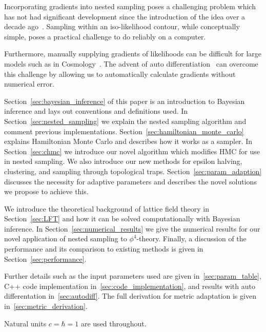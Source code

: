 \documentclass[11pt]{article}
\begin{document}
    Incorporating gradients into nested sampling poses a challenging problem which has not had significant development
    since the introduction of the idea over a decade ago~\cite{Betancourt_NS_CHMC, GMC}.
    Sampling within an iso-likelihood contour, while conceptually simple, poses a practical challenge to do reliably on
    a computer.

    Furthermore, manually supplying gradients of likelihoods can be difficult for large models such as in
    Cosmology~\cite{plank2018, Handley_2015, mukherjee2006nested}.
    The advent of auto differentiation~\cite{NEURIPS2020_9332c513, 10.1145/3458817.3476165, 10.5555/3571885.3571964}
    can overcome this challenge by allowing us to automatically calculate gradients without
    numerical error.

    Section~\ref{sec:bayesian_inference} of this paper is an introduction to Bayesian inference and lays out conventions
    and definitions used.
    In Section~\ref{sec:nested_sampling} we explain the nested sampling algorithm and comment
    previous implementations.
    Section~\ref{sec:hamiltonian_monte_carlo} explains Hamiltonian Monte Carlo and describes how it works as a sampler.
    In Section~\ref{sec:chmc} we introduce our novel algorithm which modifies HMC for use in nested sampling.
    We also introduce our new methods for epsilon halving, clustering, and sampling through topological traps.
    Section~\ref{sec:param_adaption} discusses the necessity for adaptive parameters and describes
    the novel solutions we propose to achieve this.

    We introduce the theoretical background of lattice field theory in Section~\ref{sec:LFT} and how it can be
    solved computationally with Bayesian inference.
    In Section~\ref{sec:numerical_results} we give the numerical results for our novel application of nested
    sampling to $\phi^4$-theory.
    Finally, a discussion of the performance and its comparison to existing methods is given in Section~\ref{sec:performance}.

    Further details such as the input parameters used are given in~\cref{sec:param_table},
    C++ code implementation in~\cref{sec:code_implementation}, and results with auto differentation in~\cref{sec:autodiff}.
    The full derivation for metric adaptation is given in~\cref{sec:metric_derivation}.

    Natural units $c = \hbar = 1$ are used throughout.
\end{document}
